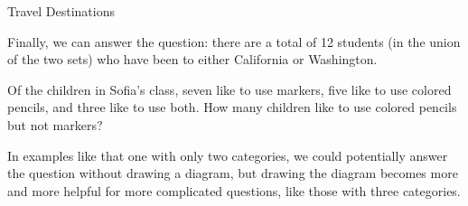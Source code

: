 \begin{example}[https://www.youtube.com/watch?v=L02esvvq8W0]{Travel Destinations}
\begin{center}
\end{center}

Finally, we can answer the question: there are a total of 12 students (in the union of the two sets) who have been to either California or Washington.

\end{example}

\begin{try}
Of the children in Sofia's class, seven like to use markers, five like to use colored pencils, and three like to use both.  How many children like to use colored pencils but not markers?
\end{try}
\vfill
\pagebreak

In examples like that one with only two categories, we could potentially answer the question without drawing a diagram, but drawing the diagram becomes more and more helpful for more complicated questions, like those with three categories.

